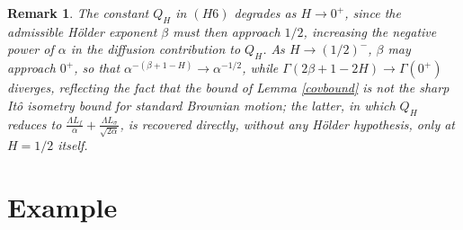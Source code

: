 \documentclass[11pt]{amsart}
\newtheorem{remark}[theorem]{Remark}
\begin{document}
\begin{remark}
The constant $Q_H$ in $(H6)$ degrades as $H\to0^+$, since the admissible H\"older exponent $\beta$ must then approach $1/2$, increasing the negative power of $\alpha$ in the diffusion contribution to $Q_H$. As $H\to\left(1/2\right)^-$, $\beta$ may approach $0^+$, so that $\alpha^{-(\beta+1-H)}\to\alpha^{-1/2}$, while $\Gamma(2\beta+1-2H)\to\Gamma(0^+)$ diverges, reflecting the fact that the bound of Lemma \ref{covbound} is not the sharp It\^o isometry bound for standard Brownian motion; the latter, in which $Q_H$ reduces to $\frac{\Lambda L_f}{\alpha}+\frac{\Lambda L_\sigma}{\sqrt{2\alpha}}$, is recovered directly, without any H\"older hypothesis, only at $H=1/2$ itself.
\end{remark}

\section{Example}
\end{document}
